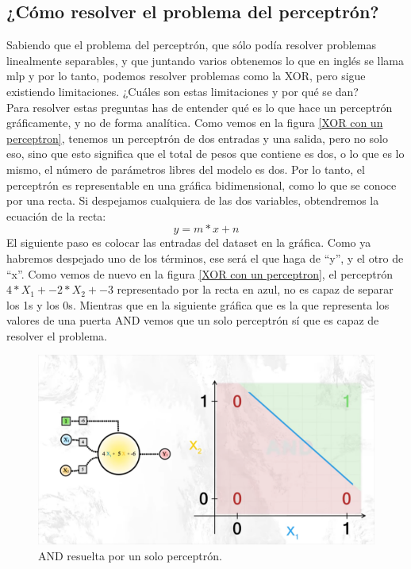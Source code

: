 \subsection{¿Cómo resolver el problema del perceptrón?}
Sabiendo que el problema del perceptrón, que sólo podía resolver problemas linealmente separables, y que juntando varios obtenemos lo que en inglés se llama \gls{mlp} y por lo tanto, podemos resolver problemas como la XOR, pero sigue existiendo limitaciones. ¿Cuáles son estas limitaciones y por qué se dan?
\\
Para resolver estas preguntas has de entender qué es lo que hace un perceptrón gráficamente, y no de forma analítica. Como vemos en la figura \ref{XOR con un perceptron}, tenemos un perceptrón de dos entradas y una salida, pero no solo eso, sino que esto significa que el total de pesos que contiene es dos, o lo que es lo mismo, el número de parámetros libres del modelo es dos. Por lo tanto, el perceptrón es representable en una gráfica bidimensional, como lo que se conoce por una recta. Si despejamos cualquiera de las dos variables, obtendremos la ecuación de la recta:
\begin{equation}
	y = m*x + n
\end{equation}
El siguiente paso es colocar las entradas del dataset en la gráfica. Como ya habremos despejado uno de los términos, ese será el que haga de ``y'', y el otro de ``x''. Como vemos de nuevo en la figura \ref{XOR con un perceptron}, el perceptrón $4*X_1 + -2*X_2 + -3$ representado por la recta en azul, no es capaz de separar los 1s y los 0s. Mientras que en la siguiente gráfica que es la que representa los valores de una puerta AND vemos que un solo perceptrón sí que es capaz de resolver el problema.
\begin{figure}[h]
	\centering
	\includegraphics[width=15cm]{archivos/imagenes/perceptron-con-and.png}
	\caption[AND resuelta por un solo perceptrón.]{AND resuelta por un solo perceptrón.}
\end{figure}

